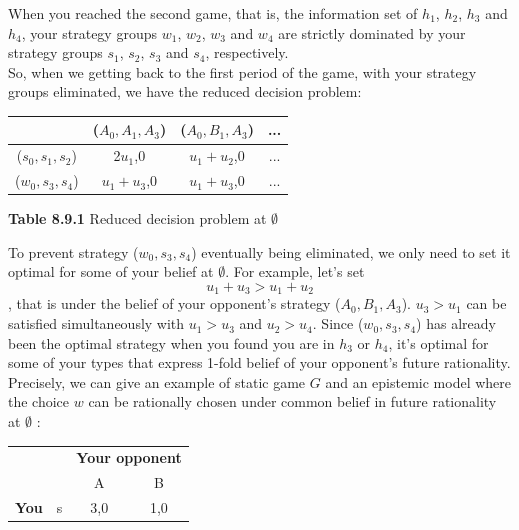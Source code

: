 \documentclass{article}
\begin{document}
\begin{description}
    When you reached the second game, that is, the information set of $h_1$, $h_2$, $h_3$ and $h_4$, your strategy groups $w_1$, $w_2$, $w_3$ and $w_4$ are strictly dominated by your strategy groups $s_1$, $s_2$, $s_3$ and $s_4$, respectively.\\
    So, when we getting back to the first period of the game, with your strategy groups eliminated, we have the reduced decision problem:
    \begin{center}
        \begin{tabular}{cccc}
        \hline
        \hline
                   & ($A_0,A_1,A_3$) & ($A_0,B_1,A_3$) &         ... \\
        \hline
        ($s_0,s_1,s_2$) &     2$u_1$,0 &  $u_1+u_2$,0 &          ... \\

        ($w_0,s_3,s_4$) &  $u_1+u_3$,0 &  $u_1+u_3$,0 &         ... \\
        \hline
        \end{tabular}

    {\bf Table 8.9.1} Reduced decision problem at $\emptyset$
    \end{center}
    To prevent strategy ($w_0,s_3,s_4$) eventually being eliminated, we only need to set it optimal for some of your belief at $\emptyset$. For example, let's set $$u_1+u_3>u_1+u_2$$, that is under the belief of your opponent's strategy ($A_0,B_1,A_3$). $u_3>u_1$ can be satisfied simultaneously with $u_1>u_3$ and $u_2>u_4$. Since ($w_0,s_3,s_4$) has already been the optimal strategy when you found you are in $h_3$ or $h_4$, it's optimal for some of your types that express 1-fold belief of your opponent's future rationality.\\

    Precisely, we can give an example of static game $G$ and an epistemic model where the choice $w$ can be rationally chosen under common belief in future rationality at $\emptyset$ :
    \begin{center}
        \begin{tabular}{rrcc}

                   &            & \multicolumn{ 2}{c}{{\bf Your opponent}} \\

                   &            &          A &          B \\

        \multicolumn{ 1}{c}{{\bf You}} &          s &        3,0 &        1,0 \\


\end{tabular}
\end{center}
\end{description}
\end{document}
